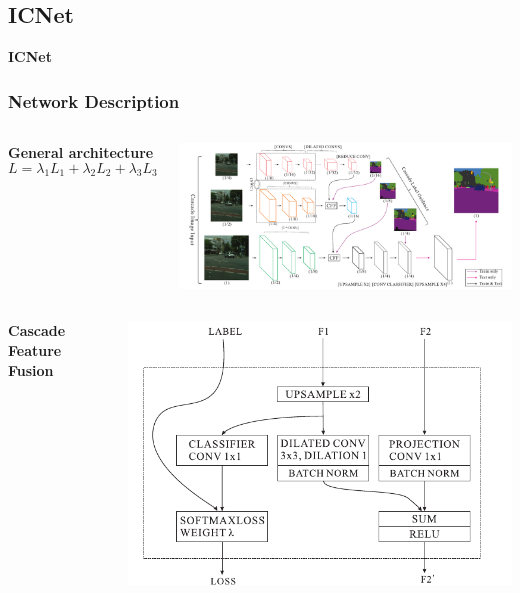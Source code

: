 \documentclass{beamer}
\begin{document}
\subsection{ICNet}

\begin{frame}
\huge{\centerline{\textbf{ICNet}}}
\end{frame}


\begin{frame}
\frametitle{Network Description}

\begin{columns}
\textbf{General architecture}\\
\begin{equation*}
L = \lambda_{1}L_{1} + \lambda_{2}L_{2} + \lambda_{3}L_{3}
\end{equation*}

\begin{center}
\includegraphics[scale=0.2]{icnet.png}
\end{center}
\end{columns}
\begin{columns}

\textbf{Cascade Feature Fusion}
\begin{center}
\includegraphics[scale=0.3]{ccf.png}
\end{center}
\end{columns}

\end{frame}
\end{document}
